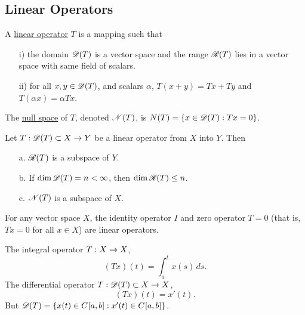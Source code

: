 \documentclass[]{article}
\begin{document}
\subsection*{Linear Operators}

\begin{definition}
	A \ul{linear operator} $T$ is a mapping such that
	\begin{enumerate}
		\item[i)] the domain $\mathscr{D}(T)$ is a vector space and the range $\mathscr{R}(T)$ lies in a vector space with same field of scalars.
		\item[ii)] for all $x,y\in \mathscr{D}(T)$, and scalars $\alpha$, $T(x+y) = Tx+Ty$ and $T(\alpha x) = \alpha Tx$.
	\end{enumerate}
\end{definition}
\begin{definition}
	The \ul{null space} of $T$, denoted $\mathscr{N}(T)$, is $N(T) = \left\{ x\in \mathscr{D}(T) : Tx=0 \right\}$.
\end{definition}
\begin{theorem}
	Let $T:\mathscr{D}(T)\subset X\rightarrow Y$ be a linear operator from $X$ into $Y$. Then
	\begin{enumerate}
		\item[a.] $\mathscr{R}(T)$ is a subspace of $Y$.
		\item[b.] If $\dim\mathscr{D}(T)=n<\infty$, then $\dim\mathscr{R}(T)\leq n$.
		\item[c.] $\mathscr{N}(T)$ is a subspace of $X$.
	\end{enumerate}
\end{theorem}
\begin{example}
	For any vector space $X$, the identity operator $I$ and zero operator $T=0$ (that is, $Tx=0$ for all $x\in X$) are linear operators.
\end{example}
\begin{example}
	[$X=\Cb{}ab$] The integral operator $T:X\rightarrow X$,
	$$(Tx)(t) = \int_a^tx(s)\,ds.$$
	The differential operator $T:\mathscr{D}(T)\subset X\rightarrow X$,
	$$ (Tx)(t) = x'(t).$$
	But $\mathscr{D}(T) = \left\{ x(t)\in C^{}{[}a,b{]} : x'(t)\in C^{}{[}a,b{]} \right\}$.
\end{example}
\end{document}
